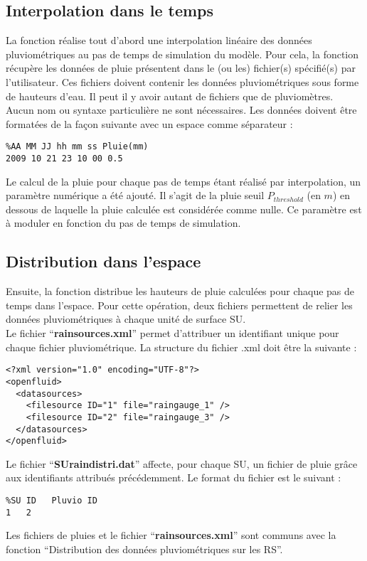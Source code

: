 \subsection{Interpolation dans le temps}
La fonction réalise tout d'abord une interpolation linéaire des données pluviométriques au pas de temps de simulation du modèle. Pour cela, la fonction récupère les données de pluie présentent dans le (ou les) fichier(s) spécifié(s) par l'utilisateur. Ces fichiers doivent contenir les données pluviométriques sous forme de hauteurs d'eau. Il peut il y avoir autant de fichiers que de pluviomètres. Aucun nom ou syntaxe particulière ne sont nécessaires. Les données doivent être formatées de la façon suivante avec un espace comme séparateur :

\begin{verbatim}
%AA MM JJ hh mm ss Pluie(mm)
2009 10 21 23 10 00 0.5
\end{verbatim}

Le calcul de la pluie pour chaque pas de temps étant réalisé par interpolation, un paramètre numérique a été ajouté. Il s'agit de la pluie seuil $P_{threshold}$ (en $m$) en dessous de laquelle la pluie calculée est considérée comme nulle. Ce paramètre est à moduler en fonction du pas de temps de simulation.


\subsection{Distribution dans l'espace}
Ensuite, la fonction distribue les hauteurs de pluie calculées pour chaque pas de temps dans l'espace. Pour cette opération, deux fichiers permettent de relier les données pluviométriques à chaque unité de surface SU.\\

Le fichier ``\textbf{rainsources.xml}'' permet d'attribuer un identifiant unique pour chaque fichier pluviométrique. La structure du fichier .xml doit être la suivante :

\begin{verbatim}
<?xml version="1.0" encoding="UTF-8"?>
<openfluid>
  <datasources>
    <filesource ID="1" file="raingauge_1" />
    <filesource ID="2" file="raingauge_3" />
  </datasources>
</openfluid>
\end{verbatim}

Le fichier ``\textbf{SUraindistri.dat}'' affecte, pour chaque SU, un fichier de pluie grâce aux identifiants attribués précédemment. Le format du fichier est le suivant :

\begin{verbatim}
%SU ID   Pluvio ID
1   2
\end{verbatim}

Les fichiers de pluies et le fichier ``\textbf{rainsources.xml}'' sont communs avec la fonction ``Distribution des données pluviométriques sur les RS''.

